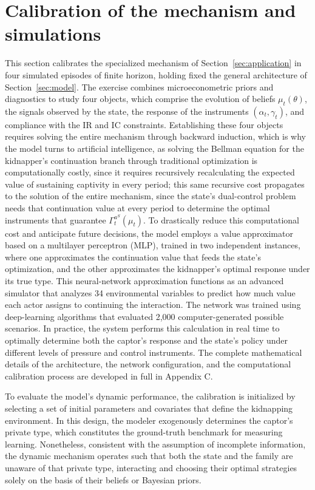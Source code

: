 \documentclass[pdflatex,sn-mathphys-ay]{sn-jnl}
\theoremstyle{plain}
\theoremstyle{definition}
\newcommand{\1}{\mathbf{1}}
\begin{document}
\section{Calibration of the mechanism and simulations}\label{sec:calibracion}
\normalfont\normalsize
This section calibrates the specialized mechanism of Section~\ref{sec:application} in four simulated episodes of finite horizon, holding fixed the general architecture of Section~\ref{sec:model}. The exercise combines microeconometric priors and diagnostics to study four objects, which comprise the evolution of beliefs $\mu_t(\theta)$, the signals observed by the state, the response of the instruments $(\alpha_t,\gamma_t)$, and compliance with the IR and IC constraints. Establishing these four objects requires solving the entire mechanism through backward induction, which is why the model turns to artificial intelligence, as solving the Bellman equation for the kidnapper's continuation branch through traditional optimization is computationally costly, since it requires recursively recalculating the expected value of sustaining captivity in every period; this same recursive cost propagates to the solution of the entire mechanism, since the state's dual-control problem needs that continuation value at every period to determine the optimal instruments that guarantee $\Gamma_t^{a^S}(\mu_t)$. To drastically reduce this computational cost and anticipate future decisions, the model employs a value approximator based on a multilayer perceptron (MLP), trained in two independent instances, where one approximates the continuation value that feeds the state's optimization, and the other approximates the kidnapper's optimal response under its true type. This neural-network approximation functions as an advanced simulator that analyzes 34 environmental variables to predict how much value each actor assigns to continuing the interaction. The network was trained using deep-learning algorithms that evaluated 2,000 computer-generated possible scenarios. In practice, the system performs this calculation in real time to optimally determine both the captor's response and the state's policy under different levels of pressure and control instruments. The complete mathematical details of the architecture, the network configuration, and the computational calibration process are developed in full in Appendix C.

To evaluate the model's dynamic performance, the calibration is initialized by selecting a set of initial parameters and covariates that define the kidnapping environment. In this design, the modeler exogenously determines the captor's private type, which constitutes the ground-truth benchmark for measuring learning. Nonetheless, consistent with the assumption of incomplete information, the dynamic mechanism operates such that both the state and the family are unaware of that private type, interacting and choosing their optimal strategies solely on the basis of their beliefs or Bayesian priors.
\end{document}
